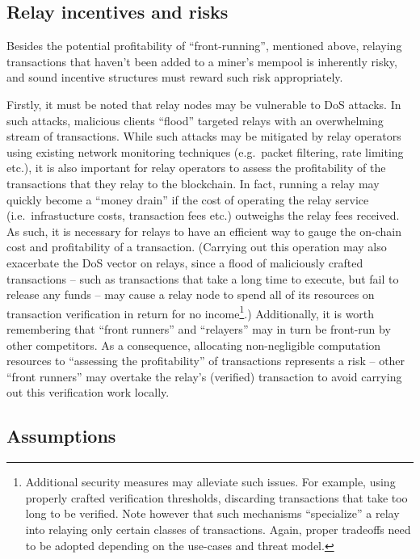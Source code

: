 \subsection{Relay incentives and risks}\label{preliminaries:introduction:incentives-risks}

Besides the potential profitability of ``front-running'', mentioned above, relaying transactions that haven't been added to a miner's mempool is inherently risky, and sound incentive structures must reward such risk appropriately.

Firstly, it must be noted that relay nodes may be vulnerable to DoS attacks. In such attacks, malicious clients ``flood'' targeted relays with an overwhelming stream of transactions. While such attacks may be mitigated by relay operators using existing network monitoring techniques (e.g.~packet filtering, rate limiting etc.), it is also important for relay operators to assess the profitability of the transactions that they relay to the blockchain. In fact, running a relay may quickly become a ``money drain'' if the cost of operating the relay service (i.e.~infrastucture costs, transaction fees etc.) outweighs the relay fees received. As such, it is necessary for relays to have an efficient way to gauge the on-chain cost and profitability of a transaction. (Carrying out this operation may also exacerbate the DoS vector on relays, since a flood of maliciously crafted transactions -- such as transactions that take a long time to execute, but fail to release any funds -- may cause a relay node to spend all of its resources on transaction verification in return for no income\footnote{Additional security measures may alleviate such issues. For example, using properly crafted verification thresholds, discarding transactions that take too long to be verified. Note however that such mechanisms ``specialize'' a relay into relaying only certain classes of transactions. Again, proper tradeoffs need to be adopted depending on the use-cases and threat model.}.)
Additionally, it is worth remembering that ``front runners'' and ``relayers'' may in turn be front-run by other competitors. As a consequence, allocating non-negligible computation resources to ``assessing the profitability'' of transactions represents a risk -- other ``front runners'' may overtake the relay's (verified) transaction to avoid carrying out this verification work locally.

\subsection{Assumptions}\label{preliminaries:assumptions}

